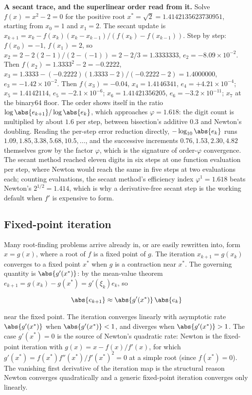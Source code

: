 \begin{example}
\textbf{A secant trace, and the superlinear order read from it.} Solve
$f(x) = x^{2} - 2 = 0$ for the positive root $x^{*} = \sqrt{2} =
1.4142135623730951$, starting from $x_{0} = 1$ and $x_{1} = 2$. The secant
update is $x_{k+1} = x_{k} - f(x_{k})(x_{k} - x_{k-1})/(f(x_{k}) -
f(x_{k-1}))$. Step by step: $f(x_{0}) = -1$, $f(x_{1}) = 2$, so $x_{2} =
2 - 2(2 - 1)/(2 - (-1)) = 2 - 2/3 = 1.3333333$, $e_{2} = -8.09 \times
10^{-2}$. Then $f(x_{2}) = 1.3333^{2} - 2 = -0.2222$, $x_{3} = 1.3333 -
(-0.2222)(1.3333 - 2)/(-0.2222 - 2) = 1.4000000$, $e_{3} = -1.42 \times
10^{-2}$. Then $f(x_{3}) = -0.04$, $x_{4} = 1.4146341$, $e_{4} = +4.21
\times 10^{-4}$; $x_{5} = 1.4142114$, $e_{5} = -2.1 \times 10^{-6}$;
$x_{6} = 1.41421356205$, $e_{6} = -3.2 \times 10^{-11}$; $x_{7}$ at the
binary64 floor. The order shows itself in the ratio $\log\abs{e_{k+1}} /
\log\abs{e_{k}}$, which approaches $\varphi = 1.618$: the digit count is
multiplied by about $1.6$ per step, between bisection's additive $0.3$ and
Newton's doubling. Reading the per-step error reduction directly,
$-\log_{10}\abs{e_{k}}$ runs $1.09, 1.85, 3.38, 5.68, 10.5, \ldots$, and
the successive increments $0.76, 1.53, 2.30, 4.82$ themselves grow by the
factor $\varphi$, which is the signature of order-$\varphi$ convergence.
The secant method reached eleven digits in six steps at one function
evaluation per step, where Newton would reach the same in five steps at
two evaluations each; counting evaluations, the secant method's efficiency
index $\varphi^{1} = 1.618$ beats Newton's $2^{1/2} = 1.414$, which is why
a derivative-free secant step is the working default when $f'$ is expensive
to form.
\end{example}

\subsection{Fixed-point iteration}

Many root-finding problems arrive already in, or are easily
rewritten into,  form $x = g(x)$, where a root
of $f$ is a fixed point of $g$. The iteration $x_{k+1} = g(x_{k})$
converges to a fixed point $x^{*}$ when $g$ is a contraction near
$x^{*}$. The governing quantity is $\abs{g'(x^{*})}$: by the
mean-value theorem $e_{k+1} = g(x_{k}) - g(x^{*}) = g'(\xi_{k})
e_{k}$, so

\[
\abs{e_{k+1}} \approx \abs{g'(x^{*})} \, \abs{e_{k}}
\]

near the fixed point. The iteration converges linearly with
asymptotic rate $\abs{g'(x^{*})}$ when $\abs{g'(x^{*})} < 1$, and
diverges when $\abs{g'(x^{*})} > 1$. The case $g'(x^{*}) = 0$ is
the source of Newton's quadratic rate: Newton is the fixed-point
iteration with $g(x) = x - f(x)/f'(x)$, for which $g'(x^{*}) =
f(x^{*}) f''(x^{*}) / f'(x^{*})^{2} = 0$ at a simple root (since
$f(x^{*}) = 0$). The vanishing first derivative of the iteration map
is the structural reason Newton converges quadratically and a
generic fixed-point iteration converges only linearly.

